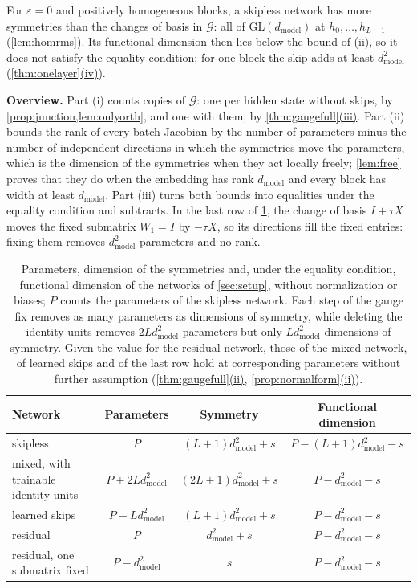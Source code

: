 \documentclass[10pt]{article}
\theoremstyle{definition}
\theoremstyle{remark}
\newcommand{\dm}{d_{\mathrm{model}}}
\newcommand{\GL}{\mathrm{GL}}
\newcommand{\G}{\mathcal{G}}
\newcommand{\para}[1]{\smallskip\noindent\textbf{#1}\hspace{0.5em}}
\DeclareRobustCommand{\cpref}[2]{\hyperref[#1:#2]{\cref*{#1}(#2)}}
\begin{document}
For $\varepsilon = 0$ and positively homogeneous blocks, a skipless network has more symmetries than the changes of basis in $\G$: all of $\GL(\dm)$ at $h_0, \dots, h_{L-1}$ (\cref{lem:homrms}). Its functional dimension then lies below the bound of (ii), so it does not satisfy the equality condition; for one block the skip adds at least $\dm^2$ (\cpref{thm:onelayer}{iv}).

\para{Overview.} Part (i) counts copies of $\G$: one per hidden state without skips, by \cref{prop:junction,lem:onlyorth}, and one with them, by \cpref{thm:gaugefull}{iii}. Part (ii) bounds the rank of every batch Jacobian by the number of parameters minus the number of independent directions in which the symmetries move the parameters, which is the dimension of the symmetries when they act locally freely; \cref{lem:free} proves that they do when the embedding has rank $\dm$ and every block has width at least $\dm$. Part (iii) turns both bounds into equalities under the equality condition and subtracts. In the last row of \cref{tab:ledger}, the change of basis $I + \tau X$ moves the fixed submatrix $W_1 = I$ by $-\tau X$, so its directions fill the fixed entries: fixing them removes $\dm^2$ parameters and no rank.

\begin{table}[ht]
\centering\small
\caption{Parameters, dimension of the symmetries and, under the equality condition, functional dimension of the networks of \cref{sec:setup}, without normalization or biases; $P$ counts the parameters of the skipless network. Each step of the gauge fix removes as many parameters as dimensions of symmetry, while deleting the identity units removes $2L\dm^2$ parameters but only $L\dm^2$ dimensions of symmetry. Given the value for the residual network, those of the mixed network, of learned skips and of the last row hold at corresponding parameters without further assumption (\cpref{thm:gaugefull}{ii}, \cpref{prop:normalform}{ii}).}
\label{tab:ledger}
\begin{tabular}{lccc}
\toprule
Network & Parameters & Symmetry & Functional dimension \\
\midrule
skipless & $P$ & $(L+1)\dm^2 + s$ & $P - (L+1)\dm^2 - s$ \\
mixed, with trainable identity units & $P + 2L\dm^2$ & $(2L+1)\dm^2 + s$ & $P - \dm^2 - s$ \\
learned skips & $P + L\dm^2$ & $(L+1)\dm^2 + s$ & $P - \dm^2 - s$ \\
residual & $P$ & $\dm^2 + s$ & $P - \dm^2 - s$ \\
residual, one submatrix fixed & $P - \dm^2$ & $s$ & $P - \dm^2 - s$ \\
\bottomrule
\end{tabular}
\end{table}
\end{document}
